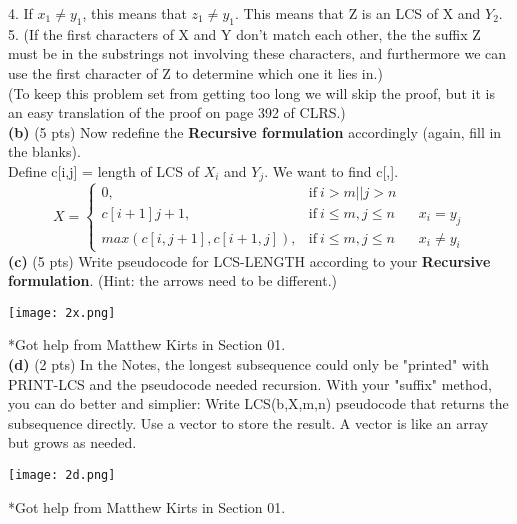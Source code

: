 \documentclass[12pt]{article}
\begin{document}
4. If $x_1 \neq y_1$, this means that $z_1 \neq y_1$. This means that Z is an LCS of X and $Y_2$. \\
5. (If the first characters of X and Y don't match each other, the the suffix Z must be in the substrings not involving these characters, and furthermore we can use the first character of Z to determine which one it lies in.) \\
\linebreak
(To keep this problem set from getting too long we will skip the proof, but it is an easy translation of the proof on page 392 of CLRS.) \\
\linebreak
\textbf{(b)} (5 pts) Now redefine the \textbf{Recursive formulation} accordingly (again, fill in the blanks). \\
\linebreak
Define c[i,j] = length of LCS of $X_i$ and $Y_j$. We want to find c[,]. \\
  \begin{equation}
    X=
    \begin{cases}
      0, & \text{if}\ i > m || j > n \\
      c[i+1] j+1, & \text{if}\ i \leqslant m, j \leqslant n && x_i = y_j \\
      max(c[i,j+1],c[i+1,j]), & \text{if}\ i \leqslant m, j \leqslant n && x_i \neq y_i
    \end{cases}
  \end{equation}
\textbf{(c)} (5 pts) Write pseudocode for LCS-LENGTH according to your \textbf{Recursive formulation}. (Hint: the arrows need to be different.) \\
\linebreak
\begin{center}
\texttt{[image: 2x.png]} \\
\end{center}
\linebreak
*Got help from Matthew Kirts in Section 01. \\
\linebreak
\textbf{(d)} (2 pts) In the Notes, the longest subsequence could only be "printed" with PRINT-LCS and the pseudocode needed recursion. With your "suffix" method, you can do better and simplier: Write LCS(b,X,m,n) pseudocode that returns the subsequence directly. Use a vector to store the result. A vector is like an array but grows as needed. \\
\linebreak
\begin{center}
\texttt{[image: 2d.png]}\\
\end{center}
\linebreak
*Got help from Matthew Kirts in Section 01. \\
\end{document}
